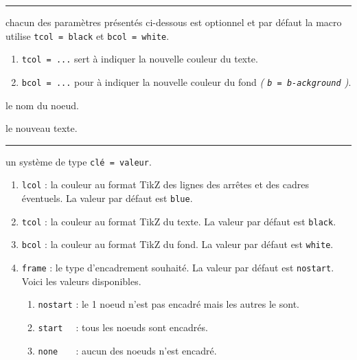 \documentclass[12pt,a4paper]{article}
\theoremstyle{definition}
\newcommand\separation{
    \medskip
    \hfill\rule{0.5\textwidth}{0.75pt}\hfill
    \medskip
}
\newcommand\extraspace{
    \vspace{0.25em}
}
\newcommand\mwhyprefix[2]{%
    \texttt{#1 = #1-#2}%
}
\begin{document}
%
%
%
%




\separation



\IDoption{} chacun des paramètres présentés ci-dessous est optionnel et par défaut la macro utilise \verb#tcol = black# et \verb#bcol = white#.

\begin{enumerate}
	\item \verb#tcol = ...# sert à indiquer la nouvelle couleur du texte.

	\item \verb#bcol = ...# pour à indiquer la nouvelle couleur du fond \emph{(\mwhyprefix{b}{ackground})}.
\end{enumerate}

 le nom du noeud.

 le nouveau texte.

%
%
%
%
%




\separation



\IDoption{} un système de type \texttt{clé = valeur}.

\begin{enumerate}    
    \item \verb#lcol# : la couleur au format TikZ des lignes des arrêtes et des cadres éventuels. La valeur par défaut est \verb#blue#.

    \item \verb#tcol# : la couleur au format TikZ du texte. La valeur par défaut est \verb#black#.

    \item \verb#bcol# : la couleur au format TikZ du fond. La valeur par défaut est \verb#white#.
    
    \extraspace
    
    \item \verb#frame# : le type d'encadrement souhaité. La valeur par défaut est \verb#nostart#. Voici les valeurs disponibles.
    \begin{enumerate}
    	\item \verb#nostart# : le 1\ier{} noeud n'est pas encadré mais les autres le sont.

    	\item \verb#start  # : tous les noeuds sont encadrés. 

    	\item \verb#none   # : aucun des noeuds n'est encadré.
    \end{enumerate}
\end{enumerate}
\end{document}

